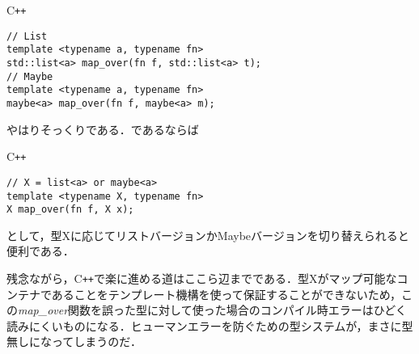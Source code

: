\documentclass[a5paper,draft]{jsbook}
\newcommand{\programminglanguage}[1]{\textsf{#1}}
\newcommand{\cxx}{\programminglanguage{C}\texttt{++}}
\newenvironment{cxxcode}{\begin{itembox}[r]{\cxx}}{\end{itembox}}
\newcommand{\pthnClassname}[1]{\textrm{#1}}
\newcommand{\pthnId}[1]{\textit{#1}}
\newcommand{\pthnKeyword}[1]{\textbf{#1}}
\newcommand{\pthnOp}[1]{\texttt{#1}}
\begin{document}
\begin{cxxcode}
\begin{verbatim}
// List
template <typename a, typename fn>
std::list<a> map_over(fn f, std::list<a> t);
// Maybe
template <typename a, typename fn>
maybe<a> map_over(fn f, maybe<a> m);
\end{verbatim}
\end{cxxcode}
やはりそっくりである．であるならば
\begin{cxxcode}
\begin{verbatim}
// X = list<a> or maybe<a>
template <typename X, typename fn>
X map_over(fn f, X x);
\end{verbatim}
\end{cxxcode}
として，型\pthnClassname{X}に応じてリストバージョンかMaybeバージョンを切り替えられると便利である．

残念ながら，\cxx で楽に進める道はここら辺までである．型\pthnClassname{X}がマップ可能なコンテナであることをテンプレート機構を使って保証することができないため，この\pthnId{map\_over}関数を誤った型に対して使った場合のコンパイル時エラーはひどく読みにくいものになる．ヒューマンエラーを防ぐための型システムが，まさに型無しになってしまうのだ．
\end{document}
